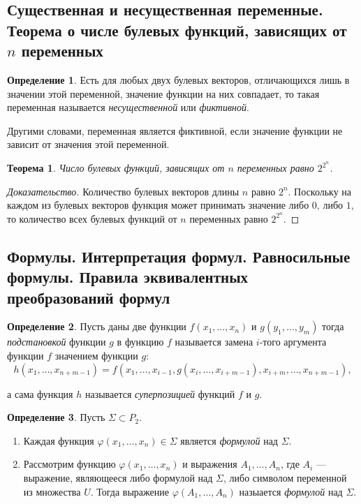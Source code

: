 \documentclass{article}
\newtheorem*{theorem*}{Теорема}
\theoremstyle{plain}
\theoremstyle{definition}
\newtheorem{definition}{Определение}[subsection]
\begin{document}
\subsection{Существенная и несущественная переменные. Теорема о числе булевых функций, зависящих от \(n\) переменных}

\begin{definition}
	Есть для любых двух булевых векторов, отличающихся лишь в значении этой переменной, значение функции на них совпадает, то такая переменная называется \textit{несущественной} или \textit{фиктивной}.
\end{definition}

Другими словами, переменная является фиктивной, если значение функции не зависит от значения этой переменной.

\begin{theorem*}
	Число булевых функций, зависящих от \(n\) переменных равно \(2^{2^n}\).
\end{theorem*}

\begin{proof}[Доказательство]
	Количество булевых векторов длины \(n\) равно \(2^n\). Поскольку на каждом из булевых векторов функция может принимать значение либо \(0\), либо \(1\), то количество всех булевых функций от \(n\) переменных равно \(2^{2^n}\).
\end{proof}

\subsection{Формулы. Интерпретация формул. Равносильные формулы. Правила эквивалентных преобразований формул}

\begin{definition}
	Пусть даны две функции \(f(x_1, \ldots, x_n)\) и \(g(y_1, \ldots, y_m)\) тогда \textit{подстановкой} функции \(g\) в функцию \(f\) называется замена \(i\)-того аргумента функции \(f\) значением функции \(g\):
	\[h(x_1, \ldots, x_{n+m-1}) = f(x_1, \ldots, x_{i-1}, g(x_i, \ldots, x_{i+m-1}), x_{i+m}, \ldots, x_{n+m-1}),\]

	а сама функция \(h\) называется \textit{суперпозицией} функций \(f\) и \(g\).
\end{definition}

\begin{definition}
	Пусть \(\Sigma \subset P_2\).

	\begin{enumerate}
		\item Каждая функция \(\varphi(x_1, \ldots, x_n) \in \Sigma\) является \textit{формулой} над \(\Sigma\).
		\item Рассмотрим функцию \(\varphi(x_1, \ldots, x_n)\) и выражения \(A_1, \ldots, A_n\), где \(A_i\) --- выражение, являющееся либо формулой над \(\Sigma\), либо символом переменной из множества \(U\). Тогда выражение \(\varphi(A_1, \ldots, A_n)\) назыается \textit{формулой} над \(\Sigma\).
	\end{enumerate}
\end{definition}
\end{document}
